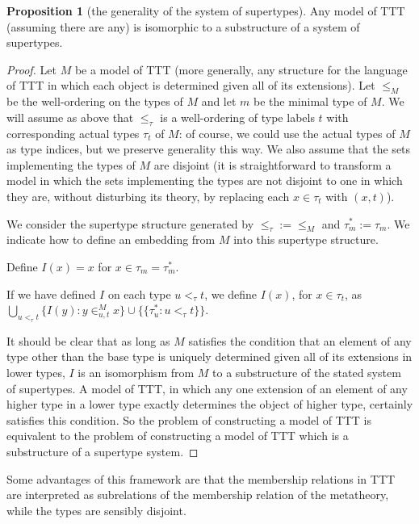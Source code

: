 \documentclass[112pt]{article}
\theoremstyle{definition}
\newtheorem{proposition}[theorem]{Proposition}
\theoremstyle{remark}
\begin{document}
\begin{proposition}[the generality of the system of supertypes]
Any model of TTT (assuming there are any) is isomorphic to a substructure of a system of supertypes.
\end{proposition}
\begin{proof}
Let $M$ be a model of TTT (more generally, any structure for the language of TTT in which each object is determined given all of its extensions).  Let $\leq_M$ be the well-ordering on the types of $M$ and let $m$ be the minimal type of $M$.  We will assume as above that $\leq_\tau$ is a well-ordering of type labels $t$ with corresponding actual types $\tau_t$ of $M$:  of course, we could use the actual types of $M$ as type indices, but we preserve generality this way.    We also assume that the sets implementing the types of $M$ are disjoint (it is straightforward to transform a model in which the sets implementing the types are not disjoint to one in which they are, without disturbing its theory, by replacing each $x \in \tau_t$ with $(x,t)$).

We consider the supertype structure generated by ${\leq_\tau}:={\leq_M}$ and $\tau^*_m := \tau_m$.  We indicate how to define an embedding from $M$ into this supertype structure.

Define $I(x) = x$ for $x \in \tau_m = \tau^*_m$.

If we have defined $I$ on each type $u <_\tau t$, we define $I(x)$, for $x \in \tau_t$, as
$\bigcup_{u <_\tau t} \{I(y):y \in^M_{u,t} x\} \cup \{\{\tau^*_u:u <_\tau t\}\}$.

It should be clear that as long as $M$ satisfies the condition that an element of any type other than the base type is uniquely determined given all of its extensions in lower types, $I$ is an isomorphism from $M$ to a substructure of the stated system of supertypes.  A model of TTT, in which any one extension of an element of any higher type in a lower type exactly determines the object of higher type, certainly satisfies this condition.  So the problem of constructing a model of TTT is equivalent to the problem of constructing a model of TTT which is a substructure of a supertype system.
\end{proof}

Some advantages of this framework are that the membership relations in TTT are interpreted as subrelations of the membership relation of the metatheory, while the types are sensibly disjoint.
\end{document}

